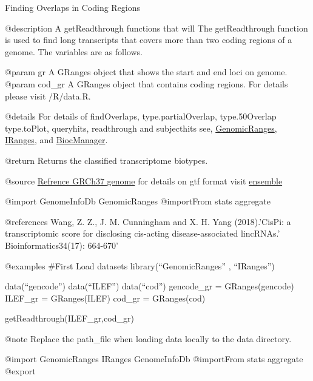 \documentclass[]{article}
\begin{document}
Finding Overlaps in Coding Regions

@description A getReadthrough functions that will The getReadthrough
function is used to find long transcripts that covers more than two
coding regions of a genome. The variables are as follows.

@param gr A GRanges object that shows the start and end loci on genome.
@param cod\_gr A GRanges object that contains coding regions. For
details please visit /R/data.R.

@details For details of findOverlaps, type.partialOverlap,
type.50Overlap type.toPlot, queryhits, readthrough and subjecthits see,
\href{https://www.bioconductor.org/packages/release/bioc/html/GenomicRanges.html}{GenomicRanges},
\href{https://www.bioconductor.org/packages/release/bioc/html/IRanges.html}{IRanges},
and \href{http://bioconductor.org/install/index.html}{BiocManager}.

@return Returns the classified transcriptome biotypes.

@source
\href{https://www.gencodegenes.org/human/release_25lift37.html}{Refrence
GRCh37 genome} for details on gtf format visit
\href{https://useast.ensembl.org/info/website/upload/gff.html}{ensemble}

@import GenomeInfoDb GenomicRanges @importFrom stats aggregate

@references Wang, Z. Z., J. M. Cunningham and X. H. Yang (2018).'CisPi:
a transcriptomic score for disclosing cis-acting disease-associated
lincRNAs.' Bioinformatics34(17): 664-670'

@examples \#First Load datasets library(``GenomicRanges'' , ``IRanges'')

data(``gencode'') data(``ILEF'') data(``cod'') gencode\_gr =
GRanges(gencode) ILEF\_gr = GRanges(ILEF) cod\_gr = GRanges(cod)

getReadthrough(ILEF\_gr,cod\_gr)


@note Replace the path\_file when loading data locally to the data
directory.

@import GenomicRanges IRanges GenomeInfoDb @importFrom stats aggregate
@export
\end{document}
